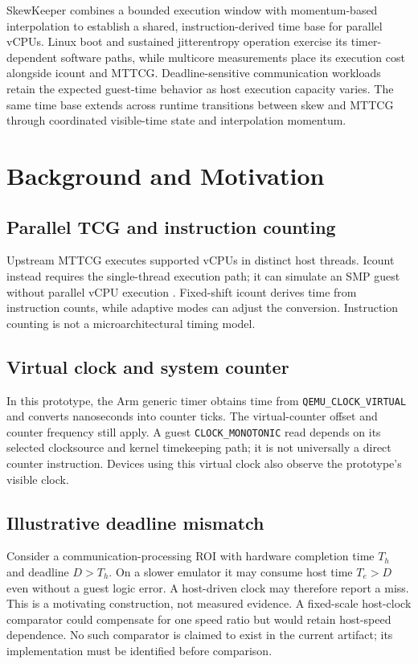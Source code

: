 \documentclass[10pt]{article}
\begin{document}
SkewKeeper combines a bounded execution window with momentum-based
interpolation to establish a shared, instruction-derived time base for
parallel vCPUs. Linux boot and sustained jitterentropy operation exercise
its timer-dependent software paths, while multicore measurements place its
execution cost alongside icount and MTTCG. Deadline-sensitive communication
workloads retain the expected guest-time behavior as host execution capacity
varies. The same time base extends across runtime transitions between skew
and MTTCG through coordinated visible-time state and interpolation momentum.

\section{Background and Motivation}
\subsection{Parallel TCG and instruction counting}
Upstream MTTCG executes supported vCPUs in distinct host threads. Icount instead
requires the single-thread execution path; it can simulate an SMP guest without
parallel vCPU execution \cite{qemumttcg,qemuicount}. Fixed-shift icount derives time
from instruction counts, while adaptive modes can adjust the conversion.
Instruction counting is not a microarchitectural timing model.

\subsection{Virtual clock and system counter}
In this prototype, the Arm generic timer obtains time from
\texttt{QEMU\_CLOCK\_VIRTUAL} and converts nanoseconds into counter ticks. The
virtual-counter offset and counter frequency still apply. A guest
\texttt{CLOCK\_MONOTONIC} read depends on its selected clocksource and kernel
timekeeping path; it is not universally a direct counter instruction.
Devices using this virtual clock also observe the prototype's visible clock.

\subsection{Illustrative deadline mismatch}
Consider a communication-processing ROI with hardware completion time $T_h$ and
deadline $D>T_h$. On a slower emulator it may consume host time $T_e>D$ even
without a guest logic error. A host-driven clock may therefore report a miss.
This is a motivating construction, not measured evidence. A fixed-scale
host-clock comparator could compensate for one speed ratio but would retain
host-speed dependence. No such comparator is claimed to exist in the current
artifact; its implementation must be identified before comparison.
\end{document}

